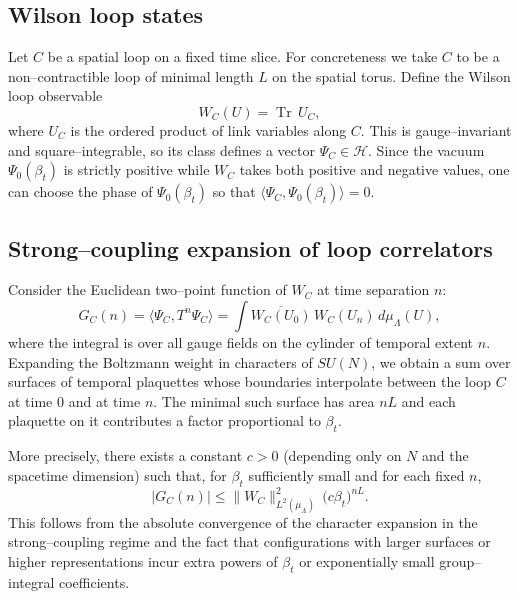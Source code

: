\documentclass[11pt]{article}
\begin{document}
\subsection{Wilson loop states}

Let $C$ be a spatial loop on a fixed time slice.  For concreteness we
take $C$ to be a non--contractible loop of minimal length $L$ on the
spatial torus.  Define the Wilson loop observable
\begin{equation}
  W_C(U) = \operatorname{Tr}\,U_C,
\end{equation}
where $U_C$ is the ordered product of link variables along $C$.  This is
gauge--invariant and square--integrable, so its class defines a vector
$\Psi_C\in\mathcal{H}$.  Since the vacuum $\Psi_0(\beta_t)$ is strictly
positive while $W_C$ takes both positive and negative values, one can
choose the phase of $\Psi_0(\beta_t)$ so that
$\langle\Psi_C,\Psi_0(\beta_t)\rangle = 0$.

\subsection{Strong--coupling expansion of loop correlators}

Consider the Euclidean two--point function of $W_C$ at time separation
$n$:
\begin{equation}
  G_C(n)
  = \langle\Psi_C, T^n \Psi_C\rangle
  = \int \overline{W_C(U_0)}\,W_C(U_n)\,d\mu_\Lambda(U),
\end{equation}
where the integral is over all gauge fields on the cylinder of temporal
extent $n$.  Expanding the Boltzmann weight in characters of $SU(N)$, we
obtain a sum over surfaces of temporal plaquettes whose boundaries
interpolate between the loop $C$ at time $0$ and at time $n$.  The
minimal such surface has area $nL$ and each plaquette on it contributes
a factor proportional to $\beta_t$.

More precisely, there exists a constant $c>0$ (depending only on $N$ and
the spacetime dimension) such that, for $\beta_t$ sufficiently small and
for each fixed $n$,
\begin{equation}
  |G_C(n)| \le \|W_C\|_{L^2(\mu_\Lambda)}^2\,
    \big(c\beta_t\big)^{nL}.
\end{equation}
This follows from the absolute convergence of the character expansion in
the strong--coupling regime and the fact that configurations with larger
surfaces or higher representations incur extra powers of $\beta_t$ or
exponentially small group--integral coefficients.
\end{document}
